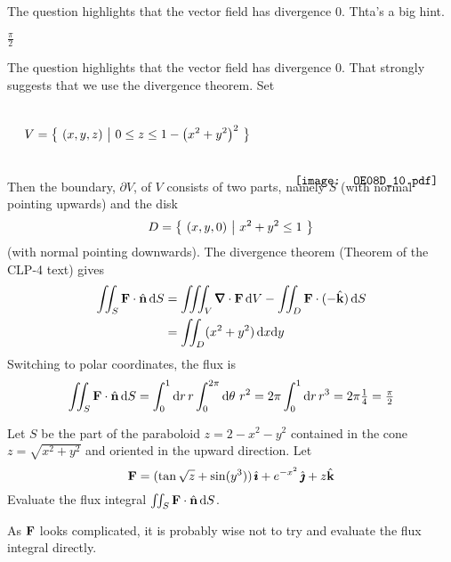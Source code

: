 \begin{hint} 
The question highlights that the vector field has divergence $0$.
Thta's a big hint.
\end{hint}

\begin{answer} 
$\frac{\pi}{2}$
\end{answer}

\begin{solution} 
The question highlights that the vector field has divergence $0$.
That strongly suggests that we use the divergence theorem.
Set
\begin{equation*}
V=\Set{(x,y,z)}{0\le z\le 1-\big(x^2+y^2\big)^2}\hskip0.5in\raisebox{-37pt}[30pt][25pt]
                         {\smash{\texttt{[image: OE08D\_10.pdf]}}}
\end{equation*}
Then the boundary, $\partial V$, of $V$ consists of two parts, namely $S$
(with normal pointing upwards) and the disk
\begin{equation*}
D=\big\{ \ (x,y,0)\ \big|\ x^2+y^2\le 1\ \big\}
\end{equation*}
(with normal pointing downwards).  The divergence theorem (Theorem  of the CLP-4 text) 
gives
\begin{align*}
\dblInt_S \vF \cdot \hn\,\dee{S}
&=\tripInt_V \vnabla\cdot\vF\,\dee{V}
    -\dblInt_D \vF \cdot (-\hk)\,\dee{S} \\
&=\dblInt_D (x^2+y^2)\,\dee{x}\dee{y} 
\end{align*}
Switching to polar coordinates, the flux is
\begin{align*}
\iint_S \mathbf{F}\cdot\hat{\mathbf{n}}\,\mathrm{d}S
=\int_0^1\mathrm{d}r\,r\int_0^{2\pi}\mathrm{d}\theta\ r^2
=2\pi \int_0^1 \mathrm{d}r\, r^3
=2\pi \tfrac{1}{4}
=\tfrac{\pi}{2}
\end{align*}

\end{solution}

\begin{question}[M317 2008A] %

Let $S$ be the part of the paraboloid $z = 2 - x^2 - y^2$ contained 
in the cone $z = \sqrt{x^2+y^2}$ and oriented in the upward direction. 
Let
\begin{equation*}
\mathbf{F} = (\tan \sqrt{z} + \sin(y^3))\,\hat{\pmb{\imath}} + e^{-x^2}\,\hat{\pmb{\jmath}} + z\hat{\mathbf{k}}
\end{equation*}
Evaluate the flux integral $\iint_S \mathbf{F} \cdot\hat{\mathbf{n}}\,\mathrm{d}S$.
\end{question}

\begin{hint} 
As $\mathbf{F}$ looks complicated, it is probably wise not to try and evaluate
the flux integral directly.
\end{hint}

